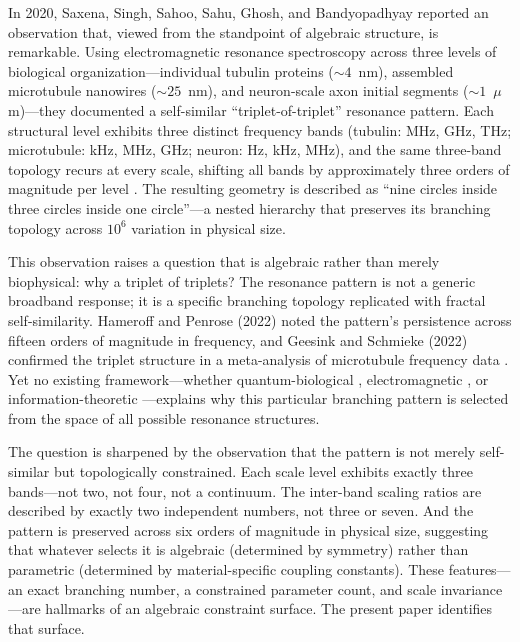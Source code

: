 \documentclass[12pt,a4paper]{article}
\begin{document}
In 2020, Saxena, Singh, Sahoo, Sahu, Ghosh, and Bandyopadhyay reported an observation that, viewed from the standpoint of algebraic structure, is remarkable. Using electromagnetic resonance spectroscopy across three levels of biological organization---individual tubulin proteins (${\sim}4$~nm), assembled microtubule nanowires (${\sim}25$~nm), and neuron-scale axon initial segments (${\sim}1$~$\mu$m)---they documented a self-similar ``triplet-of-triplet'' resonance pattern. Each structural level exhibits three distinct frequency bands (tubulin: MHz, GHz, THz; microtubule: kHz, MHz, GHz; neuron: Hz, kHz, MHz), and the same three-band topology recurs at every scale, shifting all bands by approximately three orders of magnitude per level \citep{Saxena2020}. The resulting geometry is described as ``nine circles inside three circles inside one circle''---a nested hierarchy that preserves its branching topology across $10^6$ variation in physical size.

This observation raises a question that is algebraic rather than merely biophysical: why a triplet of triplets? The resonance pattern is not a generic broadband response; it is a specific branching topology replicated with fractal self-similarity. Hameroff and Penrose (2022) noted the pattern's persistence across fifteen orders of magnitude in frequency, and Geesink and Schmieke (2022) confirmed the triplet structure in a meta-analysis of microtubule frequency data \citep{HameroffPenrose2022,GeesinkSchmieke2022}. Yet no existing framework---whether quantum-biological \citep{HameroffPenrose2014}, electromagnetic \citep{Bandyopadhyay2020}, or information-theoretic \citep{Tononi2016}---explains why this particular branching pattern is selected from the space of all possible resonance structures.

The question is sharpened by the observation that the pattern is not merely self-similar but topologically constrained. Each scale level exhibits exactly three bands---not two, not four, not a continuum. The inter-band scaling ratios are described by exactly two independent numbers, not three or seven. And the pattern is preserved across six orders of magnitude in physical size, suggesting that whatever selects it is algebraic (determined by symmetry) rather than parametric (determined by material-specific coupling constants). These features---an exact branching number, a constrained parameter count, and scale invariance---are hallmarks of an algebraic constraint surface. The present paper identifies that surface.
\end{document}
